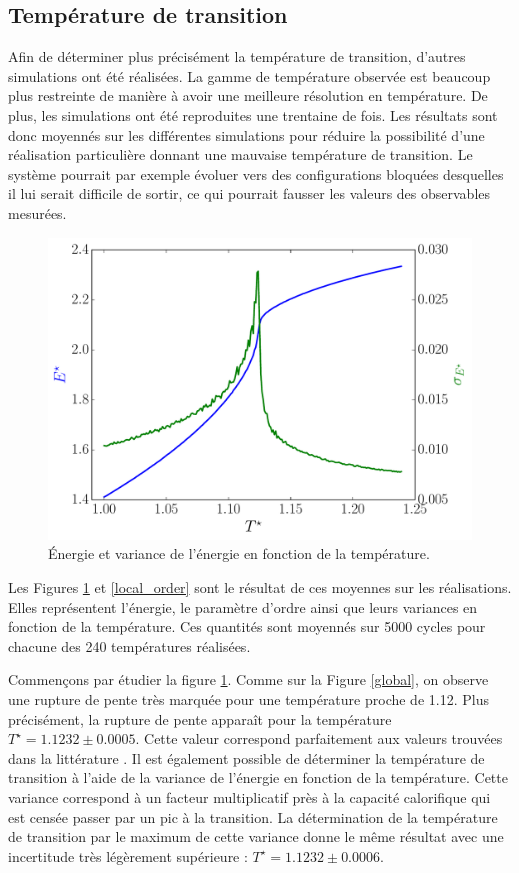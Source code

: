 \documentclass[11pt,a4paper]{article}
\numberwithin{equation}{section}
\begin{document}
\subsection{Température de transition}
\label{temptrans}
Afin de déterminer plus précisément la température de transition, d'autres simulations ont été réalisées. La gamme de température observée est beaucoup plus restreinte de manière à avoir une meilleure résolution en température. De plus, les simulations ont été reproduites une trentaine de fois. Les résultats sont donc moyennés sur les différentes simulations pour réduire la possibilité d'une réalisation particulière donnant une mauvaise température de transition. Le système pourrait par exemple évoluer vers des configurations bloquées desquelles il lui serait difficile de sortir, ce qui pourrait fausser les valeurs des observables mesurées.   

\begin{figure}[h!]
    \centering	    
	\includegraphics[scale=0.6]{figures/local_energie.pdf}
    \caption{Énergie et variance de l'énergie en fonction de la température.}
    	\label{local_energie} 
\end{figure}

Les Figures \ref{local_energie} et \ref{local_order} sont le résultat de ces moyennes sur les réalisations. Elles représentent l'énergie, le paramètre d'ordre ainsi que leurs variances en fonction de la température. Ces quantités sont moyennés sur 5000 cycles pour chacune des 240 températures réalisées.
\medskip

Commençons par étudier la figure \ref{local_energie}. Comme sur la Figure \ref{global}, on observe une rupture de pente très marquée pour une température proche de 1.12. Plus précisément, la rupture de pente apparaît pour la température $T^\star = 1.1232 \pm 0.0005$. Cette valeur correspond parfaitement aux valeurs trouvées dans la littérature \cite{fabbri,wfo, parallel, badass}. Il est également possible de déterminer la température de transition à l'aide de la variance de l'énergie en fonction de la température. Cette variance correspond à un facteur multiplicatif près à la capacité calorifique qui est censée passer par un pic à la transition. La détermination de la température de transition par le maximum de cette variance donne le même résultat avec une incertitude très légèrement supérieure : $T^\star = 1.1232 \pm 0.0006$.
\end{document}

